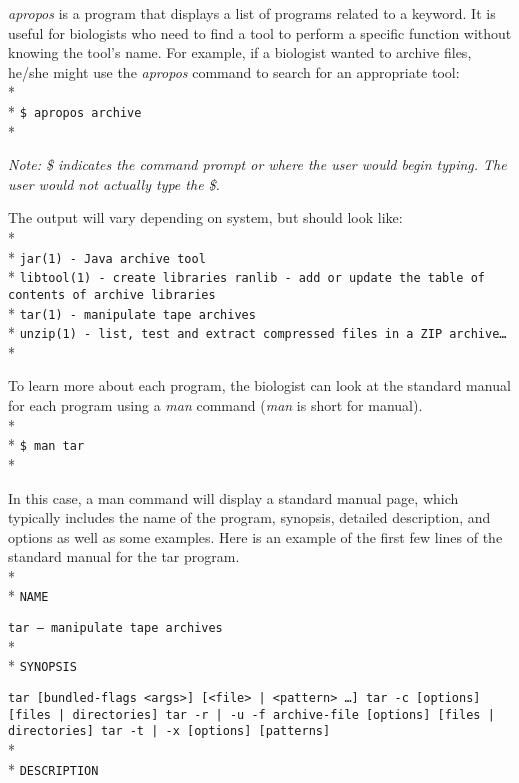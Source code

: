 \documentclass[ChapterTOCs,krantz2]{krantz} %
\begin{document}
\emph{apropos}
is a program that
displays a list of programs related to a keyword. It is
useful for biologists who need to find a tool to perform a specific function without 
knowing the tool's name. For example, if a biologist wanted to archive files,
he/she might use the \emph{apropos} command to search for an appropriate tool:\\* \\*
\texttt{\$ apropos archive}\\*

\noindent
\textsl{Note: \$ indicates the command prompt or where the user would begin typing.
The user would not actually type the \$.}

The output will vary depending on system, but should look like:\\* \\*
\texttt{jar(1)    - Java archive tool}\\*
\texttt{libtool(1)    - create libraries ranlib - add or update the table of
contents of archive libraries}\\*
\texttt{tar(1)    - manipulate tape archives}\\*
\texttt{unzip(1)    - list, test and extract compressed files in a
ZIP archive\ldots}\\*

\noindent
To learn more about each program, 
the biologist can look at the standard manual for each program using a
\emph{man} command (\emph{man} is short for manual).\\* \\*
\texttt{\$ man tar}\\*

\noindent
In this case, a man command will display a standard manual page, which
typically includes the name of the program, synopsis, detailed description, and
options as well as some examples. Here is an example of the first few lines of
the standard manual for the tar program.\\* \\*
\texttt{NAME}

\texttt{tar -- manipulate tape archives}\\* \\*
\texttt{SYNOPSIS}

\texttt{tar [bundled-flags <args>] [<file> | <pattern> \ldots] tar {-c}
[options] [files | directories] tar {-r | -u} -f archive-file [options] [files
| directories] tar {-t | -x} [options] [patterns]}\\* \\*
\texttt{DESCRIPTION}
\end{document}
